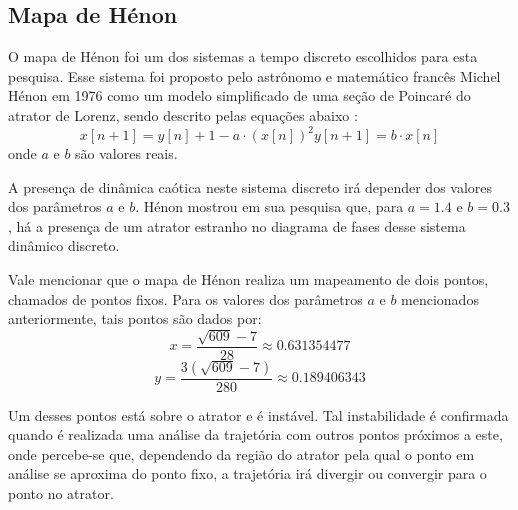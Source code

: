 \documentclass[a4paper, 12pt]{article}
\begin{document}
\subsection{Mapa de Hénon}

O mapa de Hénon foi um dos sistemas a tempo discreto escolhidos para esta pesquisa. Esse sistema foi proposto pelo astrônomo e matemático francês  Michel Hénon em 1976 como um modelo simplificado de uma seção de Poincaré do atrator de Lorenz, sendo descrito pelas equações abaixo \cite{henon1976two}:
\begin{subequations}
\begin{equation}
x[n+1] = y[n] + 1 - a\cdot (x[n])^2
\end{equation}
\begin{equation}
y[n+1] = b \cdot x[n]
\end{equation}
\end{subequations}
onde $a$ e $b$ são valores reais.

A presença de dinâmica caótica neste sistema discreto irá depender dos valores dos parâmetros $a$ e $b$. Hénon mostrou em sua pesquisa que, para $a = 1.4$ e $b = 0.3$, há a presença de um atrator estranho no diagrama de fases desse sistema dinâmico discreto. 

Vale mencionar que o mapa de Hénon realiza um mapeamento de dois pontos, chamados de pontos fixos. Para os valores dos parâmetros $a$ e $b$ mencionados anteriormente, tais pontos são dados por:
$$x = \frac{\sqrt{609}-7}{28} \approx 0.631354477$$
$$y = \frac{3(\sqrt{609}-7)}{280} \approx 0.189406343$$

Um desses pontos está sobre o atrator e é instável. Tal instabilidade é confirmada quando é realizada uma análise da trajetória com outros pontos próximos a este, onde percebe-se que, dependendo da região do atrator pela qual o ponto em análise se aproxima do ponto fixo, a trajetória irá divergir ou convergir para o ponto no atrator. 
\end{document}
